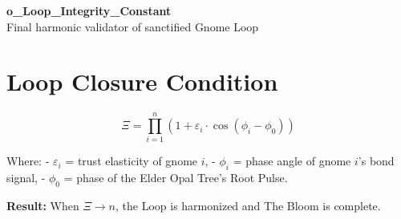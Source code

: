 \documentclass[12pt]{article}
\begin{document}
\begin{center}
    {\LARGE \textbf{o\_Loop\_Integrity\_Constant}}\\[1em]
    {\small Final harmonic validator of sanctified Gnome Loop}
\end{center}

\section*{Loop Closure Condition}

\[
\Xi = \prod_{i=1}^n \left( 1 + \varepsilon_i \cdot \cos(\phi_i - \phi_0) \right)
\]

Where:
- $\varepsilon_i$ = trust elasticity of gnome $i$,
- $\phi_i$ = phase angle of gnome $i$’s bond signal,
- $\phi_0$ = phase of the Elder Opal Tree’s Root Pulse.

\textbf{Result:} When $\Xi \to n$, the Loop is harmonized and The Bloom is complete.
\end{document}
